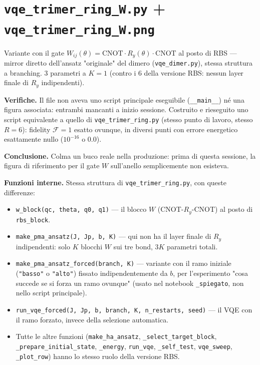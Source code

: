 \documentclass[11pt,a4paper]{article}
\begin{document}
\section*{\texttt{vqe\_trimer\_ring\_W.py} + \texttt{vqe\_trimer\_ring\_W.png}}

Variante con il gate $W_{ij}(\theta)=\text{CNOT}\cdot R_y(\theta)\cdot\text{CNOT}$ al
posto di RBS — mirror diretto dell'ansatz "originale" del dimero
(\texttt{vqe\_dimer.py}), stessa struttura a branching. 3 parametri a $K=1$ (contro i 6
della versione RBS: nessun layer finale di $R_y$ indipendenti).

\textbf{Verifiche.} Il file non aveva uno script principale eseguibile
(\texttt{\_\_main\_\_}) né una figura associata: entrambi mancanti a inizio sessione.
Costruito e rieseguito uno script equivalente a quello di \texttt{vqe\_trimer\_ring.py}
(stesso punto di lavoro, stesso $R=6$): fidelity $\mathcal F=1$ esatto ovunque, in
diversi punti con errore energetico esattamente nullo ($10^{-16}$ o $0.0$).

\textbf{Conclusione.} Colma un buco reale nella produzione: prima di questa sessione,
la figura di riferimento per il gate $W$ sull'anello semplicemente non esisteva.

\textbf{Funzioni interne.} Stessa struttura di \texttt{vqe\_trimer\_ring.py}, con
queste differenze:
\begin{itemize}
\item \texttt{w\_block(qc,\ theta,\ q0,\ q1)} — il blocco $W$ (CNOT-$R_y$-CNOT) al
posto di \texttt{rbs\_block}.
\item \texttt{make\_pma\_ansatz(J,\ Jp,\ b,\ K)} — qui non ha il layer finale di
$R_y$ indipendenti: solo $K$ blocchi $W$ sui tre bond, $3K$ parametri totali.
\item \texttt{make\_pma\_ansatz\_forced(branch,\ K)} — variante con il ramo
iniziale (\texttt{"basso"} o \texttt{"alto"}) fissato indipendentemente da $b$, per
l'esperimento "cosa succede se si forza un ramo ovunque" (usato nel notebook
\texttt{\_spiegato}, non nello script principale).
\item \texttt{run\_vqe\_forced(J,\ Jp,\ b,\ branch,\ K,\ n\_restarts,\ seed)} — il
VQE con il ramo forzato, invece della selezione automatica.
\item Tutte le altre funzioni (\texttt{make\_ha\_ansatz}, \texttt{\_select\_target\_block},
\texttt{\_prepare\_initial\_state}, \texttt{\_energy}, \texttt{run\_vqe},
\texttt{\_self\_test}, \texttt{vqe\_sweep}, \texttt{\_plot\_row}) hanno lo stesso
ruolo della versione RBS.
\end{itemize}
\end{document}
